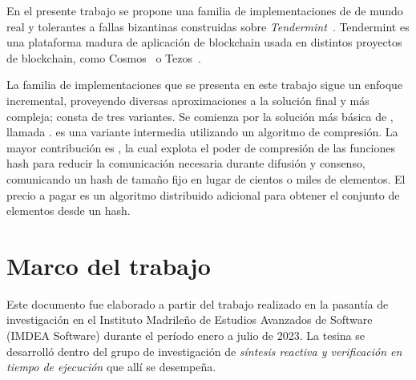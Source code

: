   En el presente trabajo se propone una familia de implementaciones de \setchain 
  de mundo real y tolerantes a fallas bizantinas construidas sobre \textit{Tendermint}~\cite{Buchman.2018.Tendermint}.
  Tendermint es una plataforma madura de aplicación de blockchain usada en distintos
  proyectos de blockchain, como Cosmos~\cite{cosmos} o Tezos~\cite{goodman14tezos}. 
  
  La familia de implementaciones que se presenta en este trabajo sigue un enfoque
  incremental, proveyendo diversas aproximaciones a la solución final y más compleja;
  consta de tres variantes.
  Se comienza por la solución más básica de \setchain, llamada \vanilla.
  \compresschain es una variante intermedia utilizando un algoritmo de compresión.
  La mayor contribución es \hashchain, la cual explota el poder de compresión de las
  funciones hash para reducir la comunicación necesaria durante difusión y consenso,
  comunicando un hash de tamaño fijo en lugar de cientos o miles de elementos.
  El precio a pagar es un algoritmo distribuido adicional para obtener el conjunto de
  elementos desde un hash.


  \section{Marco del trabajo}
  Este documento fue elaborado a partir del trabajo realizado en la pasantía de investigación
  en el Instituto Madrileño de Estudios Avanzados de Software (IMDEA Software) durante el período
  enero a julio de 2023.
  La tesina se desarrolló dentro del grupo de investigación de
  \emph{síntesis reactiva y verificación en tiempo de ejecución} que allí se desempeña.


